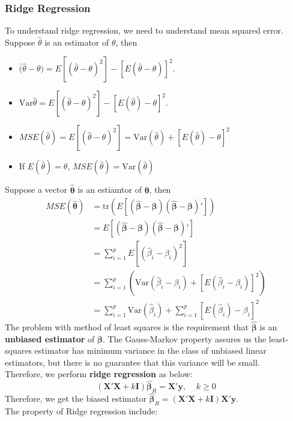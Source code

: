 \documentclass[11pt]{article}
\newcommand{\var}{\mathrm{Var}}
\newcommand{\tr}{\mathrm{tr}}
\theoremstyle{definition}
\begin{document}
\subsubsection{Ridge Regression}
To understand ridge regression, we need to understand mean squared error. Suppose $\hat{\theta}$ is an estimator of $\theta$, then
\begin{itemize}
  \item $\bar(\hat{\theta}-\theta)=E[(\hat{\theta}-\theta)^2]-[E(\hat{\theta}-\theta)]^2$.
  \item $\var{\hat{\theta}}=E[(\hat{\theta}-\theta)^2]-[E(\hat{\theta})-\theta]^2$.
  \item $MSE(\hat{\theta})=E[(\hat{\theta}-\theta)^2]=\var(\hat{\theta})+[E(\hat{\theta})-\theta]^2$
  \item If $E(\hat{\theta})=\theta$, $MSE(\hat{\theta})=\var(\hat{\theta})$
\end{itemize}
Suppose a vector $\hat{\bm{\theta}}$ is an estiamtor of $\bm{\theta}$, then
\begin{align*}
MSE(\hat{\bm{\theta}})&=\tr(E[(\hat{\bm{\beta}}-\bm{\beta})(\hat{\bm{\beta}}-\bm{\beta})'])\\
&=E[(\hat{\bm{\beta}}-\bm{\beta})(\hat{\bm{\beta}}-\bm{\beta})']\\
&=\sum_{i=1}^p E[(\hat{\beta}_i-\beta_i)^2]\\
&=\sum_{i=1}^p (\var(\hat{\beta}_i-\beta_i)+[E(\hat{\beta}_i-\beta_i)]^2)\\
&=\sum_{i=1}^p \var(\hat{\beta}_i)+\sum_{i=1}^p [E(\hat{\beta}_i)-\beta_i]^2
\end{align*}
The problem with method of least squares is the requirement that $\hat{\bm{\beta}}$ is an \textbf{unbiased estimator} of $\bm{\beta}$. The Gauss-Markov property assures us the least-squares estimator has minimum variance in the class of unbiased linear estimators, but there is no guarantee that this variance will be small.\\
Therefore, we perform \textbf{ridge regression} as below:
\[
(\bm{X}'\bm{X}+k\bm{I})\hat{\bm{\beta}}_R=\bm{X}'\bm{y},\;\;\;\;k\geq 0
\]
Therefore, we get the biased estimator $\hat{\bm{\beta}}_R=(\bm{X}'\bm{X}+k\bm{I})\bm{X}'\bm{y}$.\\
The property of Ridge regression include:
\end{document}
